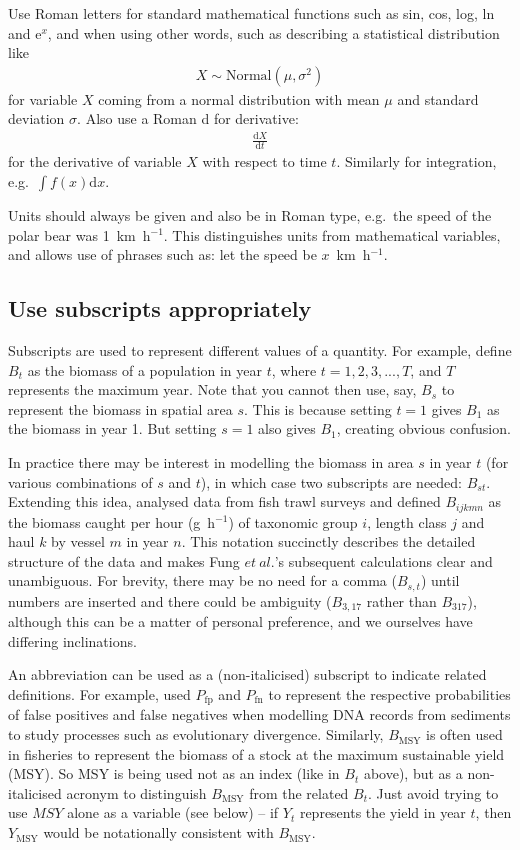 \documentclass[12pt]{article}
\newcommand{\eb}{\begin{eqnarray}}
\newcommand{\ee}{\end{eqnarray}}
\begin{document}
Use Roman letters for standard mathematical functions such as sin, cos, log, ln
and e$^x$, and
when using other words, such as describing a statistical distribution like
\eb
X \sim \mbox{Normal}(\mu, \sigma^2)
\label{Xnormal}
\ee
for variable $X$ coming from a normal distribution with mean $\mu$ and 
standard deviation $\sigma$. 
Also use a Roman d for derivative:
\eb
\frac{\mbox{d}X}{\mbox{d}t}
\ee
for the derivative of variable $X$ with respect to time $t$. Similarly for 
integration, e.g.~$\int f(x) \mbox{d}x$. 

Units should always be given and also be in Roman type, e.g.~the speed of the polar bear was
1~km~h$^{-1}$. This distinguishes units from mathematical variables, and allows
use of phrases such
as: let the speed be $x$~km~h$^{-1}$. 



\subsection*{Use subscripts appropriately}

Subscripts are used to represent different values of a quantity. 
For example, define $B_t$ as the biomass of a population in year $t$, where 
$t=1, 2, 3, ..., T$, and $T$ represents the maximum year.
Note that you cannot then
use, say, $B_s$ to represent the biomass in spatial area $s$. This is
because setting $t=1$ gives $B_1$ as the biomass in year 1. But 
setting $s=1$ also gives $B_1$, creating obvious confusion. 

In practice there may be interest in modelling the biomass in
area $s$ in year $t$ (for various combinations of $s$ and $t$),
in which case two subscripts are needed: $B_{st}$.
Extending this idea, \citet{ffrr12} analysed data from fish trawl surveys
and defined
$B_{ijkmn}$ as the biomass caught per hour (g~h$^{-1}$) of
taxonomic group $i$,
length class $j$
and haul $k$ by
vessel $m$ in
year $n$. This notation succinctly describes the detailed structure of the data
and makes Fung $et~al.$'s subsequent calculations clear and unambiguous.
For brevity, there may be no need for a comma ($B_{s,t}$) until numbers are 
inserted and there
could be ambiguity ($B_{3,17}$ rather than $B_{317}$),
although this can be a matter of personal preference, and we ourselves have
differing inclinations.

An abbreviation can be used as a (non-italicised) subscript to indicate related
definitions.
For example, \citet{olajos18} used $P_\mathrm{fp}$ and $P_\mathrm{fn}$ to 
represent the respective probabilities of false positives and false negatives
when modelling DNA records from sediments to study processes such as
evolutionary divergence.
Similarly, $B_\mathrm{MSY}$ is often
used in fisheries to represent the biomass of a stock at the maximum sustainable
yield (MSY). So MSY is being used not as an index (like in $B_t$ above), but as 
a non-italicised acronym to 
distinguish $B_\mathrm{MSY}$ from the related $B_t$. 
Just avoid trying to use $MSY$ alone as
a variable (see below) -- if $Y_t$ represents the yield in 
year $t$, then 
$Y_\mathrm{MSY}$  would be notationally consistent with 
$B_\mathrm{MSY}$. 
\end{document}
